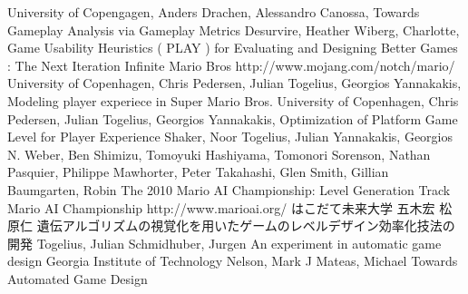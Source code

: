 \begin{thebibliography}{10}
 University of Copengagen, Anders Drachen, Alessandro Canossa, Towards Gameplay Analysis via Gameplay Metrics
 Desurvire, Heather Wiberg, Charlotte, Game Usability Heuristics ( PLAY ) for Evaluating and Designing Better Games : The Next Iteration  Infinite Mario Bros http://www.mojang.com/notch/mario/  University of Copenhagen, Chris Pedersen, Julian Togelius, Georgios Yannakakis, Modeling player experiece in Super Mario Bros.
 University of Copenhagen, Chris Pedersen, Julian Togelius, Georgios Yannakakis, Optimization of Platform Game Level for Player Experience
 Shaker, Noor Togelius, Julian Yannakakis, Georgios N.  Weber, Ben Shimizu, Tomoyuki Hashiyama, Tomonori Sorenson, Nathan Pasquier, Philippe Mawhorter, Peter Takahashi, Glen Smith, Gillian Baumgarten, Robin The 2010 Mario AI Championship: Level Generation Track
 Mario AI Championship http://www.marioai.org/
 はこだて未来大学 五木宏 松原仁 遺伝アルゴリズムの視覚化を用いたゲームのレベルデザイン効率化技法の開発
 Togelius, Julian Schmidhuber, Jurgen An experiment in automatic game design
 Georgia Institute of Technology Nelson, Mark J Mateas, Michael Towards Automated Game Design
\end{thebibliography}
